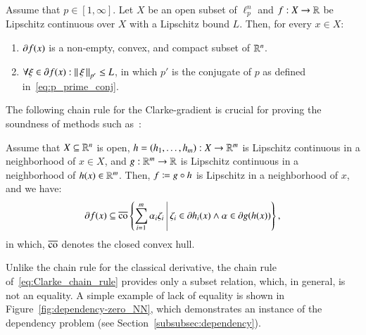 \documentclass[11pt,times]{article}
\begin{document}
\begin{proposition}
  \label{prop:Clarke_general_properties}
  Assume that $p \in [1,\infty]$. Let $X$ be an open subset of
  $\ell^n_p$ and $f: X \to \mathbb{R}$ be Lipschitz continuous over $X$ with a
  Lipschitz bound $L$. Then, for every $x \in X$:

  \begin{enumerate}[label=(\roman*)] \item
  \label{item:clarke_convex_compact_subset_Rn} $\partial f(x)$ is a
  non-empty, convex, and compact subset of $\mathbb{R}^n$.  \item $\forall \xi
  \in \partial f(x): {\left\lVert\thinspace {\xi} \thinspace \right\rVert}_{p'} \leq L$, in which $p'$ is the
  conjugate of $p$ as defined in~\eqref{eq:p_prime_conj}.
  \end{enumerate} \end{proposition}





The following chain rule for the Clarke-gradient is crucial for
proving the soundness of methods such
as~\parencite{Chaudhuri_et_al:Proving_Programs_Robust:2011,Chaudhuri_et_al:Continuity_Robustness:2012,Jordan_Dimakis:Exactly_NeurIPS:2020,Jordan_Dimakis:Provable_ICML:2021,Laurel_et_al:Dual_Number:2022}:


\begin{proposition}
  \label{prop:Clarke_chain_rule}
  Assume that $X \subseteq \mathbb{R}^n$ is open,
  $h = (h_1, \ldots, h_m): X \to \mathbb{R}^m$ is Lipschitz continuous in a
  neighborhood of $x \in X$, and $g : \mathbb{R}^m \to \mathbb{R}$ is Lipschitz
  continuous in a neighborhood of $h(x) \in \mathbb{R}^m$. Then,
  $f \coloneqq g \circ h$ is Lipschitz in a neighborhood of $x$, and we
  have:
%
  \begin{equation}
    \label{eq:Clarke_chain_rule}
    \clarke{f}(x) \subseteq \cl{\convHull} \setbarTall{\sum_{i=1}^m
      \alpha_i \zeta_i}{ \zeta_i \in \clarke{h_i}(x) \wedge \alpha \in
    \clarke{g}(h(x))},
\end{equation}
%
in which, $\overline{\operatorname{co}}$ denotes the closed convex hull.
\end{proposition}

Unlike the chain rule for the classical derivative, the chain rule
of~\eqref{eq:Clarke_chain_rule} provides only a subset relation,
which, in general, is not an equality. A simple example of lack of
equality is shown in Figure~\ref{fig:dependency-zero_NN}, which
demonstrates an instance of the dependency problem (see
Section~\ref{subsubsec:dependency}).
\end{document}
